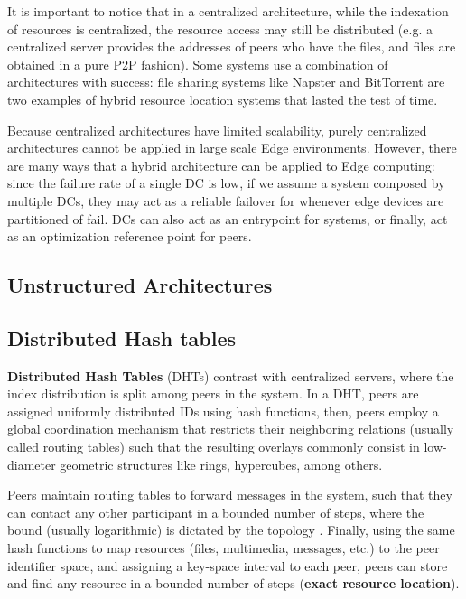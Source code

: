 It is important to notice that in a centralized architecture, while the indexation of resources is centralized, the resource access may still be distributed (e.g. a centralized server provides the addresses of peers who have the files, and files are obtained in a pure P2P fashion). Some systems use a combination of architectures with success: file sharing systems like Napster and BitTorrent \cite{cohen2003incentives} are two examples of hybrid resource location systems that lasted the test of time. 

Because centralized architectures have limited scalability, purely centralized architectures cannot be applied in large scale Edge environments. However, there are many ways that a hybrid architecture can be applied to Edge computing: since the failure rate of a single DC is low, if we assume a system composed by multiple DCs, they may act as a reliable failover for whenever edge devices are partitioned of fail. DCs can also act as an entrypoint for systems, or finally, act as an optimization reference point for peers. 

\subsection{Unstructured Architectures}


\subsection{Distributed Hash tables}

\textbf{Distributed Hash Tables} (DHTs) contrast with centralized servers, where the index distribution is split among peers in the system. In a DHT, peers are assigned uniformly distributed IDs using hash functions, then, peers employ a global coordination mechanism that restricts their neighboring relations (usually called routing tables) such that the resulting overlays commonly consist in low-diameter geometric structures like rings, hypercubes, among others. %

Peers maintain routing tables to forward messages in the system, such that they can contact any other participant in a bounded number of steps, where the bound (usually logarithmic) is dictated by the topology . Finally, using the same hash functions to map resources (files, multimedia, messages, etc.) to the peer identifier space, and assigning a key-space interval to each peer, peers can store and find any resource in a bounded number of steps (\textbf{exact resource location}).

